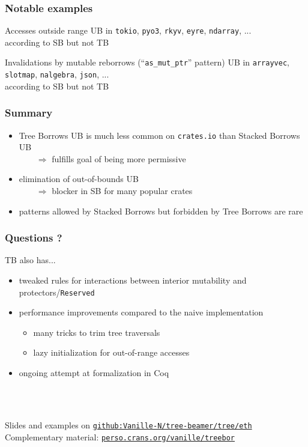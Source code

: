 \begin{frame}
    \frametitle{Notable examples}
    \begin{block}{Accesses outside range}
        UB in \texttt{tokio}, \texttt{pyo3}, \texttt{rkyv}, \texttt{eyre}, \texttt{ndarray}, ...\\
        according to SB but not TB
    \end{block}
    \begin{block}{Invalidations by mutable reborrows (``\texttt{as\_mut\_ptr}'' pattern)}
        UB in \texttt{arrayvec}, \texttt{slotmap}, \texttt{nalgebra}, \texttt{json}, ...\\
        according to SB but not TB
    \end{block}
\end{frame}

\begin{frame}
    \frametitle{Summary}
    \begin{itemize}
        \item Tree Borrows UB is much less common on \texttt{crates.io} than Stacked Borrows UB\\
            \(\qquad\Rightarrow\) fulfills goal of being more permissive
        \item elimination of out-of-bounds UB\\
            \(\qquad\Rightarrow\) blocker in SB for many popular crates
        \item patterns allowed by Stacked Borrows but forbidden by Tree Borrows are rare
    \end{itemize}
\end{frame}

\begin{frame}
    \frametitle{Questions ?}

    TB also has...
    \begin{itemize}
        \item tweaked rules for interactions between interior mutability and protectors/\texttt{Reserved}
        \item performance improvements compared to the naive implementation
            \begin{itemize}
                \item many tricks to trim tree traversals
                \item lazy initialization for out-of-range accesses
            \end{itemize}
        \item ongoing attempt at formalization in Coq
    \end{itemize}~\\~\\
    \vfill

    Slides and examples on \href{https://github.com/Vanille-N/tree-beamer}{\texttt{github:Vanille-N/tree-beamer/tree/eth}}\\
    Complementary material: \href{https://perso.crans.org/vanille/treebor}{\texttt{perso.crans.org/vanille/treebor}}\\
\end{frame}

